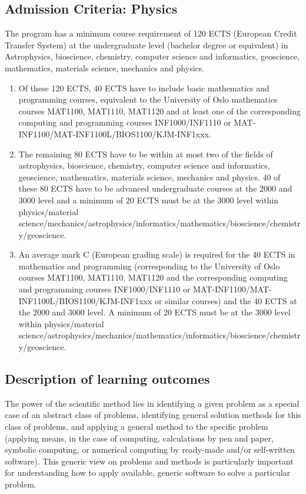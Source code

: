 \documentclass[%
oneside,                 %
final,                   %
10pt]{article}
\begin{document}
\noindent
\subsection{Admission Criteria: Physics}
The program has a minimum course requirement of 120 ECTS (European Credit Transfer System) at the undergraduate level (bachelor degree or equivalent) in Astrophysics, bioscience, chemistry, computer science and informatics, geoscience, mathematics, materials science, mechanics and physics. 
\begin{enumerate}
\item Of these 120 ECTS, 40 ECTS have to include basic mathematics and programming courses, equivalent to the University of Oslo mathematics courses MAT1100, MAT1110, MAT1120 and at least one of the corresponding computing and programming courses INF1000/INF1110 or MAT-INF1100/MAT-INF1100L/BIOS1100/KJM-INF1xxx. 

\item The remaining 80 ECTS have to be within at most two of the fields of astrophysics, bioscience, chemistry, computer science and informatics, geoscience, mathematics, materials science, mechanics and physics. 40 of these 80 ECTS have to be advanced undergraduate courses at the 2000 and 3000 level and a minimum of 20 ECTS must be at the 3000 level within physics/material science/mechanics/astrophysics/informatics/mathematics/bioscience/chemistry/geoscience.

\item An average mark C (European grading scale) is required for the 40 ECTS in mathematics and programming (corresponding  to the University of Oslo courses  MAT1100, MAT1110, MAT1120  and the corresponding computing and programming courses INF1000/INF1110 or MAT-INF1100/MAT-INF1100L/BIOS1100/KJM-INF1xxx or similar courses) and the 40 ECTS at the 2000 and 3000 level. A minimum of 20 ECTS must be at the 3000 level within physics/material science/astrophysics/mechanics/mathematics/informatics/bioscience/chemistry/geoscience.
\end{enumerate}

\noindent
\subsection{Description of learning outcomes}

The power of the scientific method lies in identifying a given problem
as a special case of an abstract class of problems, identifying
general solution methods for this class of problems, and applying a
general method to the specific problem (applying means, in the case of
computing, calculations by pen and paper, symbolic computing, or
numerical computing by ready-made and/or self-written software). This
generic view on problems and methods is particularly important for
understanding how to apply available, generic software to solve a
particular problem.
\end{document}
